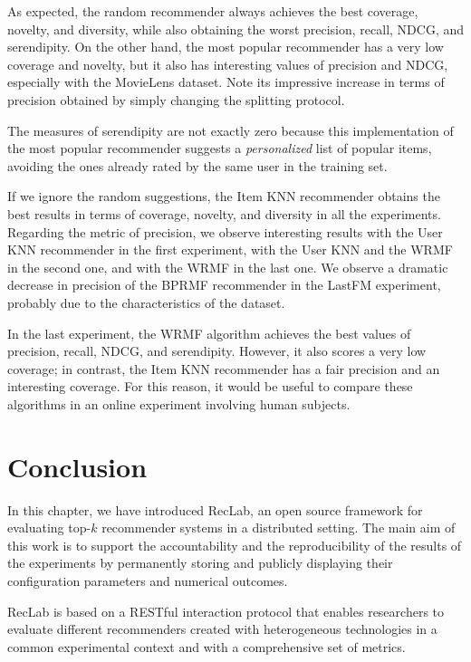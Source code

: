 As expected, the random recommender always achieves the best coverage, novelty, and diversity, while also obtaining the worst precision, recall, NDCG, and serendipity. On the other hand, the most popular recommender has a very low coverage and novelty, but it also has interesting values of precision and NDCG, especially with the MovieLens dataset. Note its impressive increase in terms of precision obtained by simply changing the splitting protocol.

The measures of serendipity are not exactly zero because this implementation of the most popular recommender suggests a \emph{personalized} list of popular items, avoiding the ones already rated by the same user in the training set.

If we ignore the random suggestions, the Item KNN recommender obtains the best results in terms of coverage, novelty, and diversity in all the experiments. Regarding the metric of precision, we observe interesting results with the User KNN recommender in the first experiment, with the User KNN and the WRMF in the second one, and with the WRMF in the last one. We observe a dramatic decrease in precision of the BPRMF recommender in the LastFM experiment, probably due to the characteristics of the dataset.

In the last experiment, the WRMF algorithm achieves the best values of precision, recall, NDCG, and serendipity. However, it also scores a very low coverage; in contrast, the Item KNN recommender has a fair precision and an interesting coverage. For this reason, it would be useful to compare these algorithms in an online experiment involving human subjects.


\section{Conclusion}
\label{lab:sec:conclusion}

In this chapter, we have introduced RecLab, an open source framework for evaluating top-$k$ recommender systems in a distributed setting. The main aim of this work is to support the accountability and the reproducibility of the results of the experiments by permanently storing and publicly displaying their configuration parameters and numerical outcomes.

RecLab is based on a RESTful interaction protocol that enables researchers to evaluate different recommenders created with heterogeneous technologies in a common experimental context and with a comprehensive set of metrics.

